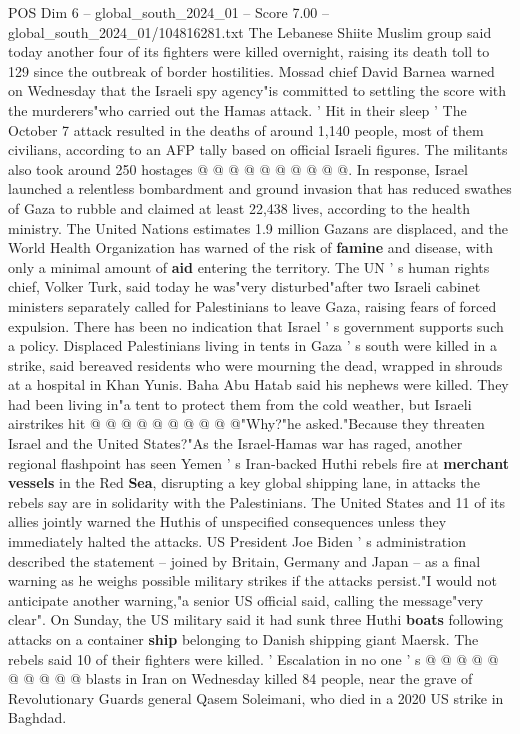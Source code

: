 \begin{textsample}{POS Dim 6 – global\_south\_2024\_01 – Score 7.00 – global\_south\_2024\_01/104816281.txt}
The Lebanese Shiite Muslim group said today another four of its fighters were killed overnight, raising its death toll to 129 since the outbreak of border hostilities.
Mossad chief David Barnea warned on Wednesday that the Israeli spy agency"is committed to settling the score with the murderers"who carried out the Hamas attack. ' Hit in their sleep ' The October 7 attack resulted in the deaths of around 1,140 people, most of them civilians, according to an AFP tally based on official Israeli figures.
The militants also took around 250 hostages @ @ @ @ @ @ @ @ @ @.
In response, Israel launched a relentless bombardment and ground invasion that has reduced swathes of Gaza to rubble and claimed at least 22,438 lives, according to the health ministry.
The United Nations estimates 1.9 million Gazans are displaced, and the World Health Organization has warned of the risk of \textbf{famine} and disease, with only a minimal amount of \textbf{aid} entering the territory.
The UN ' s human rights chief, Volker Turk, said today he was"very disturbed"after two Israeli cabinet ministers separately called for Palestinians to leave Gaza, raising fears of forced expulsion.
There has been no indication that Israel ' s government supports such a policy.
Displaced Palestinians living in tents in Gaza ' s south were killed in a strike, said bereaved residents who were mourning the dead, wrapped in shrouds at a hospital in Khan Yunis.
Baha Abu Hatab said his nephews were killed.
They had been living in"a tent to protect them from the cold weather, but Israeli airstrikes hit @ @ @ @ @ @ @ @ @ @"Why?"he asked."Because they threaten Israel and the United States?"As the Israel-Hamas war has raged, another regional flashpoint has seen Yemen ' s Iran-backed Huthi rebels fire at \textbf{merchant} \textbf{vessels} in the Red \textbf{Sea}, disrupting a key global shipping lane, in attacks the rebels say are in solidarity with the Palestinians.
The United States and 11 of its allies jointly warned the Huthis of unspecified consequences unless they immediately halted the attacks.
US President Joe Biden ' s administration described the statement -- joined by Britain, Germany and Japan -- as a final warning as he weighs possible military strikes if the attacks persist."I would not anticipate another warning,"a senior US official said, calling the message"very clear".
On Sunday, the US military said it had sunk three Huthi \textbf{boats} following attacks on a container \textbf{ship} belonging to Danish shipping giant Maersk.
The rebels said 10 of their fighters were killed. ' Escalation in no one ' s @ @ @ @ @ @ @ @ @ @ blasts in Iran on Wednesday killed 84 people, near the grave of Revolutionary Guards general Qasem Soleimani, who died in a 2020 US strike in Baghdad.

\end{textsample}
